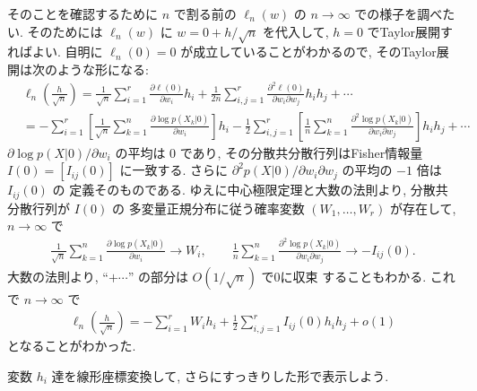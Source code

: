 \documentclass[12pt,twoside]{jarticle}
\renewcommand\d{\partial}
\theoremstyle{jplain}
\theoremstyle{jplain}
\theoremstyle{jplain}
\numberwithin{theorem}{section}
\numberwithin{equation}{section}
\numberwithin{figure}{section}
\numberwithin{table}{section}
\begin{document}
そのことを確認するために $n$ で割る前の $\ell_n(w)$ の $n\to\infty$
での様子を調べたい. そのためには $\ell_n(w)$
に $w=0+h/\sqrt{n}$ を代入して, $h=0$ でTaylor展開すればよい.
自明に $\ell_n(0)=0$ が成立していることがわかるので,
そのTaylor展開は次のような形になる:
\begin{align*}
  &
  \ell_n\left(\frac{h}{\sqrt{n}}\right)
  = \frac{1}{\sqrt{n}} \sum_{i=1}^r \frac{\d\ell(0)}{\d w_i}h_i
  + \frac{1}{2n}\sum_{i,j=1}^r\frac{\d^2\ell(0)}{\d w_i\d w_j}h_i h_j
  + \cdots
  \\ &
  = -\sum_{i=1}^r\left[
  \frac{1}{\sqrt{n}}\sum_{k=1}^n\frac{\d\log p(X_k|0)}{\d w_i}
  \right] h_i
  -\frac{1}{2}\sum_{i,j=1}^r\left[
  \frac{1}{n}\sum_{k=1}^n\frac{\d^2\log p(X_k|0)}{\d w_i\d w_j}
  \right]h_i h_j
  + \cdots
\end{align*}
$\d\log p(X|0)/\d w_i$ の平均は $0$ であり,
その分散共分散行列はFisher情報量 $I(0)=[I_{ij}(0)]$ に一致する.
さらに $\d^2 p(X|0)/\d w_i\d w_j$ の平均の $-1$ 倍は $I_{ij}(0)$ の
定義そのものである.
ゆえに中心極限定理と大数の法則より, 分散共分散行列が $I(0)$ の
多変量正規分布に従う確率変数 $(W_1,\ldots,W_r)$ が存在して,
$n\to\infty$ で
\begin{align*}
  \frac{1}{\sqrt{n}}\sum_{k=1}^n\frac{\d\log p(X_k|0)}{\d w_i}
  \to W_i,
  \qquad
  \frac{1}{n}\sum_{k=1}^n\frac{\d^2\log p(X_k|0)}{\d w_i\d w_j}
  \to -I_{ij}(0).
\end{align*}
大数の法則より, ``$+\cdots$'' の部分は $O(1/\sqrt{n})$ で0に収束
することもわかる. これで $n\to\infty$ で
\begin{align*}
  \ell_n\left(\frac{h}{\sqrt{n}}\right)
  = -\sum_{i=1}^r W_i h_i
  + \frac{1}{2}\sum_{i,j=1}^r I_{ij}(0) h_i h_j
  + o(1)
\end{align*}
となることがわかった.

変数 $h_i$ 達を線形座標変換して, さらにすっきりした形で表示しよう.
\end{document}

